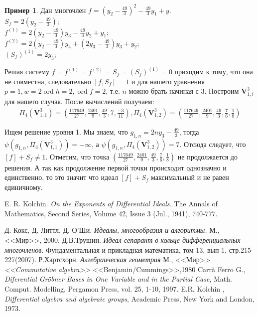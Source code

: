\documentclass[16pt]{article}
\DeclareMathOperator{\ord}{ord}
\theoremstyle{plain}
\theoremstyle{definition}
\newtheorem{example}[theorem]{Пример}
\theoremstyle{remark}
\begin{document}
\begin{example}
Дан многочлен $f=(y_2-\frac{49}{3})^2-\frac{49}{3}y_1+y$.
\\
$S_f=2(y_2-\frac{49}{3})$;
\\
$f^{(1)}=2(y_2-\frac{49}{3})y_3-\frac{49}{3}y_2+y_1$;
\\
$f^{(2)}=2(y_2-\frac{49}{3})y_4+(2y_3-\frac{49}{3})y_3+y_2$;
\\
$(S_f)^{(1)}=2y_3$;

Решая систему $f=f^{(1)}=f^{(2)}=S_f=(S_f)^{(1)}=0$ приходим к тому,
что она не совместна, следовательно $[f,S_f]=1$ и  для нашего
уравнения $p=1,w=2\ord{h}=2,\ord{f}=2$, т.е. $n$  можно брать начиная с $3$. Построим $\mathbf{V}_{1,i}^3$ для нашего случая. После вычислений получаем: 
\begin{gather*}
\Pi_{4}(\mathbf{V}_{1,1}^3)=\left(\frac{117649}{27},\frac{2401}{9},\frac{49}{3},7,\frac{-3}{11}\right),
\Pi_{4}(\mathbf{V}_{1,2}^3)=\left(\frac{117649}{27},\frac{2401}{9},\frac{49}{3},\frac{7}{6},\frac{1}{8}\right)
\end{gather*}

Ищем решение уровня 1. Мы знаем, что $g_{1,n}=2ny_3-\frac{49}{3}$, тогда $\psi(g_{1,n},\Pi_{4}(\mathbf{V}_{1,1}^3))=-\infty$, а $\psi(g_{1,n},\Pi_{4}(\mathbf{V}_{1,2}^3))=7$. Отсюда следует, что $[f]+S_f\not=1$. Отметим, что точка $\left(\frac{117649}{27},\frac{2401}{9},\frac{49}{3},\frac{7}{6},\frac{1}{8}\right)$ не продолжается до решения.  А так как продолжение первой точки происходит однозначно и единственно, то это значит что идеал $[f]+S_f$ максимальный и не равен единичному.


\end{example}







\begin{thebibliography}{99}

E. R. Kolchin.
\emph{On the Exponents of Differential Ideals.}
The Annals of Mathematics, Second Series, Volume 42, Issue 3 (Jul., 1941), 740-777.

Д. Кокс, Д. Литтл, Д. О'Ши.
\emph{Идеалы, многообразия и алгоритмы.}
М., <<Мир>>, 2000.
Д.В.Трушин.
\emph{Идеал сепарант в кольце дифференциальных многочленов.}
Фундаментальная и прикладная математика, том 13, вып 1, стр.215-227(2007).
Р.Хартсхорн.
\emph{Алгебраическая геометрия}
М., <<Мир>>
\emph{<<Commutative algebra>>}
<<Benjamin/Cummings>>,1980
Carr\`a Ferro G.,
\emph{Diferential Gr\"{o}bner Bases in One Variable and in the Partial Case},
Math. Comput. Modelling, Pergamon Press, vol. 25, 1-10, 1997.
E.R. Kolchin ,
\emph{ Differential algebra and algebraic groups}, Academic Press, New York and London, 1973.
\end{thebibliography}
\end{document}
